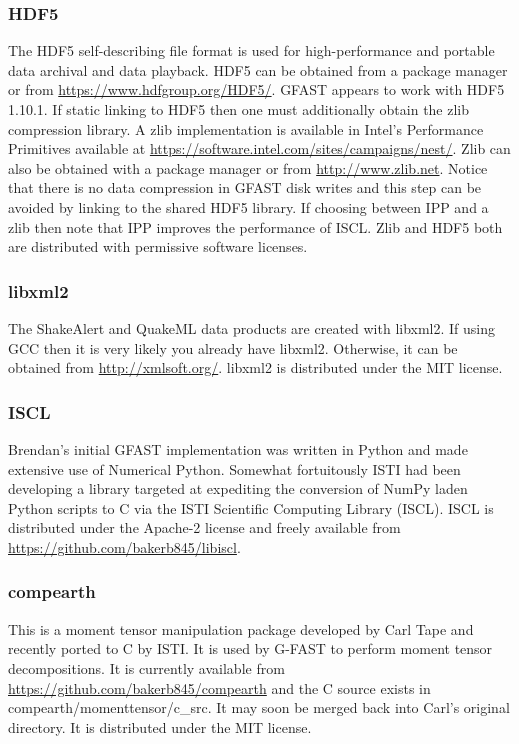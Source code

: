 \documentclass[12pt]{article}
\begin{document}
\subsubsection{HDF5}
The HDF5 self-describing file format is used for high-performance and portable data archival and
data playback.  HDF5 can be obtained from a package manager or from 
\url{https://www.hdfgroup.org/HDF5/}. 
GFAST appears to work with HDF5 1.10.1.  If static linking to HDF5 then one must additionally 
obtain the zlib compression library.  A zlib implementation is available in Intel's 
Performance Primitives available at \url{https://software.intel.com/sites/campaigns/nest/}.  Zlib
can also be obtained with a package manager or from \url{http://www.zlib.net}.  
Notice that there is no data compression in GFAST disk writes and this step can be avoided by
linking to the shared HDF5 library.  If choosing between IPP and a zlib then note that
IPP improves the performance of ISCL.   Zlib and HDF5 both are distributed with permissive
software licenses.

\subsubsection{libxml2}
The ShakeAlert and QuakeML data products are created with libxml2.  If using GCC then it
is very likely you already have libxml2.  Otherwise, it can be obtained from 
\url{http://xmlsoft.org/}.  libxml2 is distributed under the MIT license. 

\subsubsection{ISCL}
Brendan's initial GFAST implementation was written in Python and made extensive use of 
Numerical Python.  Somewhat fortuitously ISTI had been developing a library targeted 
at expediting the conversion of NumPy laden Python scripts to C via the ISTI Scientific
Computing Library (ISCL).  ISCL is distributed under the Apache-2 license and 
freely available from \url{https://github.com/bakerb845/libiscl}.

\subsubsection{compearth}
This is a moment tensor manipulation package developed by Carl Tape and recently ported to C by ISTI. 
It is used by G-FAST to perform moment tensor decompositions.
It is currently available from \url{https://github.com/bakerb845/compearth} and the C source exists in compearth/momenttensor/c\_src.  
It may soon be merged back into Carl's original directory.  It is distributed under the MIT license.
\end{document}
